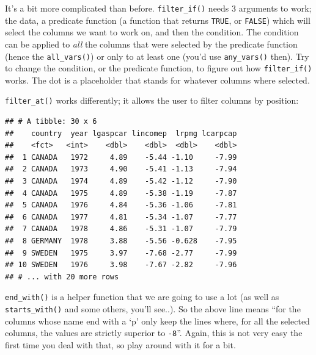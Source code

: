\documentclass[]{gitbook}
\newenvironment{Shaded}{\begin{snugshade}}{\end{snugshade}}
\newcommand{\DecValTok}[1]{\textcolor[rgb]{0.00,0.00,0.81}{#1}}
\newcommand{\KeywordTok}[1]{\textcolor[rgb]{0.13,0.29,0.53}{\textbf{#1}}}
\newcommand{\NormalTok}[1]{#1}
\newcommand{\OperatorTok}[1]{\textcolor[rgb]{0.81,0.36,0.00}{\textbf{#1}}}
\newcommand{\StringTok}[1]{\textcolor[rgb]{0.31,0.60,0.02}{#1}}
\theoremstyle{definition}
\theoremstyle{definition}
\theoremstyle{definition}
\theoremstyle{remark}
\begin{document}
It's a bit more complicated than before. \texttt{filter\_if()} needs 3
arguments to work; the data, a predicate function (a function that
returns \texttt{TRUE}, or \texttt{FALSE}) which will select the columns
we want to work on, and then the condition. The condition can be applied
to \emph{all} the columns that were selected by the predicate function
(hence the \texttt{all\_vars()}) or only to at least one (you'd use
\texttt{any\_vars()} then). Try to change the condition, or the
predicate function, to figure out how \texttt{filter\_if()} works. The
dot is a placeholder that stands for whatever columns where selected.

\texttt{filter\_at()} works differently; it allows the user to filter
columns by position:

\begin{Shaded}
\end{Shaded}

\begin{verbatim}
## # A tibble: 30 x 6
##    country  year lgaspcar lincomep  lrpmg lcarpcap
##    <fct>   <int>    <dbl>    <dbl>  <dbl>    <dbl>
##  1 CANADA   1972     4.89    -5.44 -1.10     -7.99
##  2 CANADA   1973     4.90    -5.41 -1.13     -7.94
##  3 CANADA   1974     4.89    -5.42 -1.12     -7.90
##  4 CANADA   1975     4.89    -5.38 -1.19     -7.87
##  5 CANADA   1976     4.84    -5.36 -1.06     -7.81
##  6 CANADA   1977     4.81    -5.34 -1.07     -7.77
##  7 CANADA   1978     4.86    -5.31 -1.07     -7.79
##  8 GERMANY  1978     3.88    -5.56 -0.628    -7.95
##  9 SWEDEN   1975     3.97    -7.68 -2.77     -7.99
## 10 SWEDEN   1976     3.98    -7.67 -2.82     -7.96
## # ... with 20 more rows
\end{verbatim}

\texttt{end\_with()} is a helper function that we are going to use a lot
(as well as \texttt{starts\_with()} and some others, you'll see..). So
the above line means ``for the columns whose name end with a `p' only
keep the lines where, for all the selected columns, the values are
strictly superior to \texttt{-8}''. Again, this is not very easy the
first time you deal with that, so play around with it for a bit.
\end{document}

